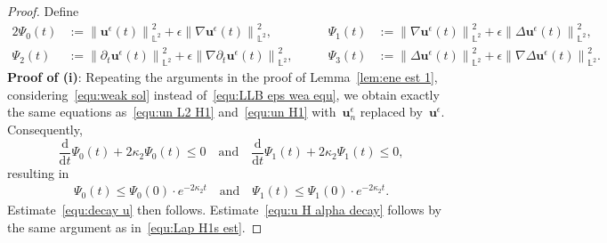 \documentclass[11pt,reqno]{amsart}
\theoremstyle{definition}
\numberwithin{equation}{section}
\newcommand{\bff}{\boldsymbol}
\newcommand{\bb}{\mathbb}
\newcommand{\ddt}{\frac{\mathrm{d}}{\mathrm{d}t}}
\newcommand{\pa}{\partial}
\newcommand{\norm}[2]{\left\|{#1}\right\|_{#2}}
\begin{document}
\begin{proof}
	Define
	\begin{alignat*}{2}
		\Psi_0(t)
		&:= 
		\norm{\bff{u}^\epsilon(t)}{\bb{L}^2}^2 
		+
		\epsilon \norm{\nabla \bff{u}^\epsilon(t)}{\bb{L}^2}^2,
		\qquad &
		\Psi_1(t)
		&:= 
		\norm{\nabla \bff{u}^\epsilon(t)}{\bb{L}^2}^2 
		+
		\epsilon \norm{\Delta \bff{u}^\epsilon(t)}{\bb{L}^2}^2,
		\\
		\Psi_2(t)
		&:= 
		\norm{\pa_t\bff{u}^\epsilon(t)}{\bb{L}^2}^2
		+
		\epsilon \norm{\nabla\pa_t\bff{u}^\epsilon(t)}{\bb{L}^2}^2,
		\qquad &
		\Psi_3(t)
		&:= 
		\norm{\Delta\bff{u}^\epsilon(t)}{\bb{L}^2}^2
		+
		\epsilon \norm{\nabla\Delta\bff{u}^\epsilon(t)}{\bb{L}^2}^2.
	\end{alignat*}
	\noindent
	\textbf{Proof of (i)}:
	Repeating the arguments in the proof of Lemma~\ref{lem:ene est 1},
	considering~\eqref{equ:weak sol} instead of~\eqref{equ:LLB eps wea equ},
	we obtain exactly the same equations as~\eqref{equ:un L2 H1}
	and~\eqref{equ:un H1} with~$\bff{u}_n^\epsilon$ replaced
	by~$\bff{u}^\epsilon$. Consequently,
	\begin{equation}\label{equ:Psi0 Psi1}
		\ddt \Psi_0(t)
		+
		2\kappa_2 \Psi_0(t)
		\leq 0
		\quad\text{and}\quad 
		\ddt \Psi_1(t)
		+
		2\kappa_2 \Psi_1(t)
		\leq 0,
	\end{equation}
	resulting in
	\begin{align*}%
		\Psi_0(t)\leq \Psi_0(0)\cdot e^{-2\kappa_2 t}
		\quad\text{and}\quad 
		\Psi_1(t)\leq \Psi_1(0)\cdot e^{-2\kappa_2 t}.
	\end{align*}
	Estimate~\eqref{equ:decay u} then follows. Estimate~\eqref{equ:u H alpha decay} follows by the same argument as in~\eqref{equ:Lap H1s est}.


\end{proof}
\end{document}
